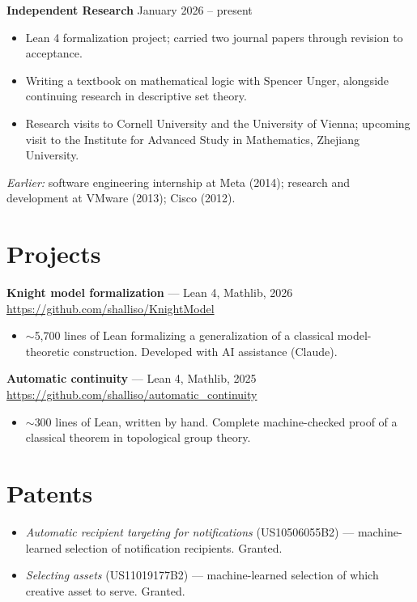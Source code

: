 \documentclass[letterpaper,10pt]{article}
\begin{document}
\vspace{3pt}
\textbf{Independent Research} \hfill January 2026 -- present\par\vspace{1pt}
\begin{itemize}
  \item Lean 4 formalization project; carried two journal papers
        through revision to acceptance.
  \item Writing a textbook on mathematical logic with Spencer Unger, alongside
        continuing research in descriptive set theory.
  \item Research visits to Cornell University and the University of Vienna;
        upcoming visit to the Institute for Advanced Study in Mathematics,
        Zhejiang University.
\end{itemize}

\vspace{4pt}
\emph{Earlier:} software engineering internship at Meta (2014); research and
development at VMware (2013); Cisco (2012).

\section{Projects}

\textbf{Knight model formalization} --- Lean 4, Mathlib, 2026 \hfill
\url{https://github.com/shalliso/KnightModel}
\begin{itemize}
  \item $\sim$5,700 lines of Lean formalizing a generalization of a classical
        model-theoretic construction. Developed with AI assistance
        (Claude).
\end{itemize}

\vspace{3pt}
\textbf{Automatic continuity} --- Lean 4, Mathlib, 2025 \hfill
\url{https://github.com/shalliso/automatic_continuity}
\begin{itemize}
  \item $\sim$300 lines of Lean, written by hand. Complete machine-checked
        proof of a classical theorem in topological group theory.
\end{itemize}

\section{Patents}

\begin{itemize}
  \item \emph{Automatic recipient targeting for notifications} (US10506055B2)
        --- machine-learned selection of notification recipients. Granted.
  \item \emph{Selecting assets} (US11019177B2) --- machine-learned selection of
        which creative asset to serve. Granted.
\end{itemize}
\end{document}
